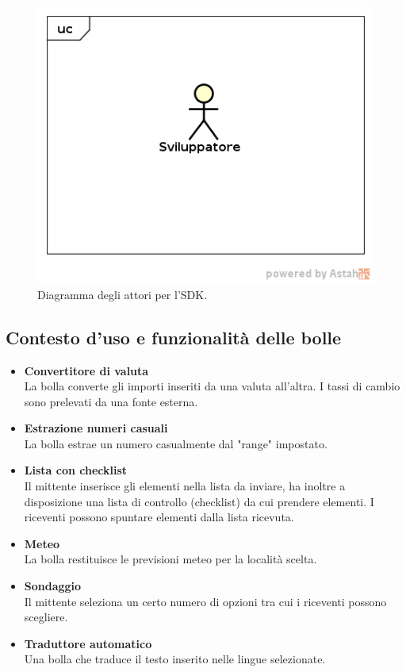    \FloatBarrier
   \begin{figure}[ht]
   \centering
   \includegraphics[scale=0.45]{img/attori_sdk.png}
   \caption{Diagramma degli attori per l'SDK.}
\end{figure}

\clearpage
\subsection{Contesto d'uso e funzionalità delle bolle}
\begin{itemize}
\item \textbf{Convertitore di valuta}\\
La bolla converte gli importi inseriti da una valuta all'altra. I tassi di cambio sono prelevati da una fonte esterna.
\item \textbf{Estrazione numeri casuali}\\
La bolla estrae un numero casualmente dal "range" impostato.
\item \textbf{Lista con checklist}\\
Il mittente inserisce gli elementi nella lista da inviare, ha inoltre a disposizione una lista di controllo (checklist) da cui prendere elementi. I riceventi possono spuntare elementi dalla lista ricevuta.
\item \textbf{Meteo}\\
 La bolla restituisce le previsioni meteo per la località scelta.
\item \textbf{Sondaggio}\\
Il mittente seleziona un certo numero di opzioni tra cui i riceventi possono scegliere.
\item \textbf{Traduttore automatico}\\
Una bolla che traduce il testo inserito nelle lingue selezionate.
\end{itemize}

